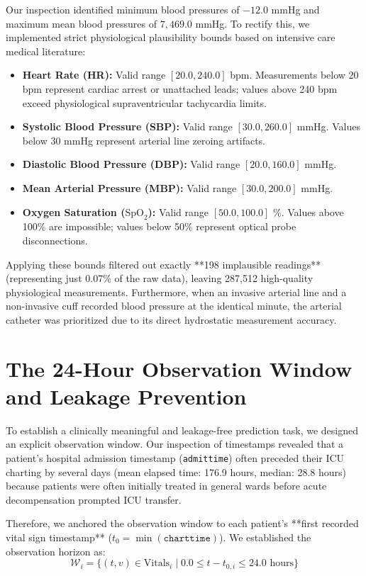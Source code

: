 \documentclass[12pt,a4paper,oneside]{report}
\begin{document}
Our inspection identified minimum blood pressures of $-12.0$ mmHg and maximum mean blood pressures of $7,469.0$ mmHg. To rectify this, we implemented strict physiological plausibility bounds based on intensive care medical literature:
\begin{itemize}
    \item \textbf{Heart Rate (HR):} Valid range $[20.0, 240.0]$ bpm. Measurements below 20 bpm represent cardiac arrest or unattached leads; values above 240 bpm exceed physiological supraventricular tachycardia limits.
    \item \textbf{Systolic Blood Pressure (SBP):} Valid range $[30.0, 260.0]$ mmHg. Values below 30 mmHg represent arterial line zeroing artifacts.
    \item \textbf{Diastolic Blood Pressure (DBP):} Valid range $[20.0, 160.0]$ mmHg.
    \item \textbf{Mean Arterial Pressure (MBP):} Valid range $[30.0, 200.0]$ mmHg.
    \item \textbf{Oxygen Saturation ($\text{SpO}_2$):} Valid range $[50.0, 100.0]$ \%. Values above 100\% are impossible; values below 50\% represent optical probe disconnections.
\end{itemize}

Applying these bounds filtered out exactly **198 implausible readings** (representing just 0.07\% of the raw data), leaving 287,512 high-quality physiological measurements. Furthermore, when an invasive arterial line and a non-invasive cuff recorded blood pressure at the identical minute, the arterial catheter was prioritized due to its direct hydrostatic measurement accuracy.

\section{The 24-Hour Observation Window and Leakage Prevention}
\label{sec:observation_window}

To establish a clinically meaningful and leakage-free prediction task, we designed an explicit observation window. Our inspection of timestamps revealed that a patient's hospital admission timestamp (\texttt{admittime}) often preceded their ICU charting by several days (mean elapsed time: 176.9 hours, median: 28.8 hours) because patients were often initially treated in general wards before acute decompensation prompted ICU transfer.

Therefore, we anchored the observation window to each patient's **first recorded vital sign timestamp** ($t_{0} = \min(\texttt{charttime})$). We established the observation horizon as:
\begin{equation}
\mathcal{W}_i = \{ (t, v) \in \text{Vitals}_i \mid 0.0 \le t - t_{0, i} \le 24.0 \text{ hours} \}
\end{equation}
\end{document}
